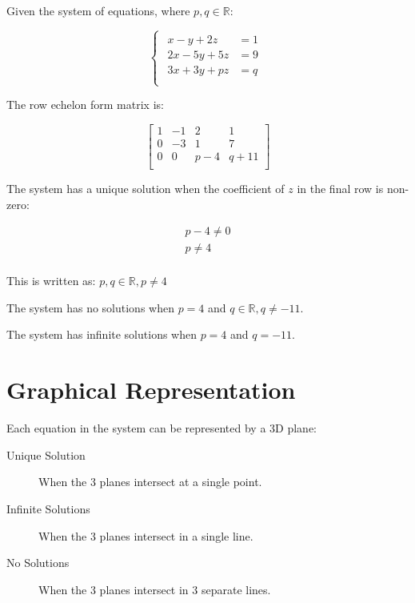 \documentclass[a4paper,11pt]{article}
\begin{document}
Given the system of equations, where $p, q \in \mathbb{R}$:

$$
\begin{cases}
\begin{aligned}
x - y + 2z & = 1 \\
2x - 5y + 5z & = 9 \\
3x + 3y + pz & = q \\
\end{aligned}
\end{cases}
$$

The row echelon form matrix is:

$$
\begin{bmatrix}
1 & -1 & 2 & 1 \\
0 & -3 & 1 & 7 \\
0 & 0 & p - 4 & q + 11 \\
\end{bmatrix}
$$

The system has a unique solution when the coefficient of $z$ in the final row
is non-zero:

$$
\begin{aligned}
p - 4 \neq 0 \\
p \neq 4 \\
\end{aligned}
$$

This is written as: $p, q \in \mathbb{R}, p \neq 4$

The system has no solutions when $p = 4$ and $q \in \mathbb{R}, q \neq -11$.

The system has infinite solutions when $p = 4$ and $q = -11$.




\section{Graphical Representation}

Each equation in the system can be represented by a 3D plane:

\begin{description}
\item [Unique Solution] When the 3 planes intersect at a single point.
\item [Infinite Solutions] When the 3 planes intersect in a single line.
\item [No Solutions] When the 3 planes intersect in 3 separate lines.
\end{description}
\end{document}
